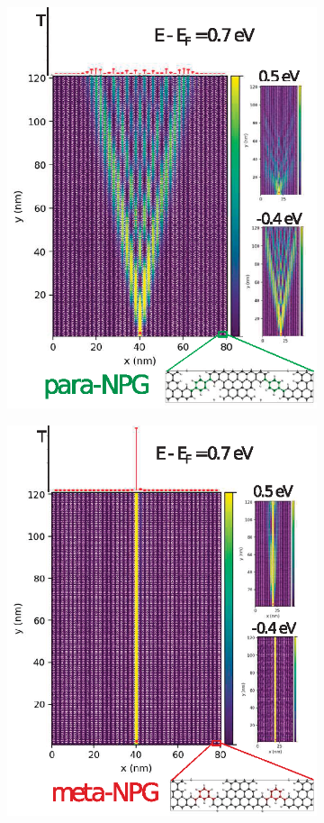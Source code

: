 \begin{figure}[h]
\begin{subfigure}[b]{.45\textwidth}
	    \includegraphics[width=.9\textwidth]{Figures/Fig_3para.eps}
	    \caption{}
	    \label{studyfig3para}
	\end{subfigure}
	\quad
	\begin{subfigure}[b]{.45\textwidth}
        \centering
	    \includegraphics[width=.9\textwidth]{Figures/Fig_3meta.eps}

\end{subfigure}
\end{figure}
